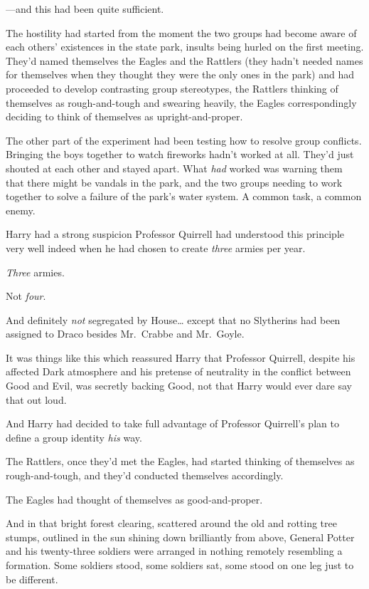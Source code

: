 ---and this had been quite sufficient.

The hostility had started from the moment the two groups had become aware of 
each others' existences in the state park, insults being hurled on the first 
meeting. They'd named themselves the Eagles and the Rattlers (they hadn't 
needed names for themselves when they thought they were the only ones in the 
park) and had proceeded to develop contrasting group stereotypes, the Rattlers 
thinking of themselves as rough-and-tough and swearing heavily, the Eagles 
correspondingly deciding to think of themselves as upright-and-proper.

The other part of the experiment had been testing how to resolve group 
conflicts. Bringing the boys together to watch fireworks hadn't worked at all. 
They'd just shouted at each other and stayed apart. What \emph{had} worked was 
warning them that there might be vandals in the park, and the two groups 
needing to work together to solve a failure of the park's water system. A 
common task, a common enemy.

Harry had a strong suspicion Professor Quirrell had understood this principle 
very well indeed when he had chosen to create \emph{three} armies per year.

\emph{Three} armies.

Not \emph{four}.

And definitely \emph{not} segregated by House{\ldots} except that no Slytherins 
had been assigned to Draco besides Mr.~Crabbe and Mr.~Goyle.

It was things like this which reassured Harry that Professor Quirrell, despite 
his affected Dark atmosphere and his pretense of neutrality in the conflict 
between Good and Evil, was secretly backing Good, not that Harry would ever 
dare say that out loud.

And Harry had decided to take full advantage of Professor Quirrell's plan to 
define a group identity \emph{his} way.

The Rattlers, once they'd met the Eagles, had started thinking of themselves as 
rough-and-tough, and they'd conducted themselves accordingly.

The Eagles had thought of themselves as good-and-proper.

And in that bright forest clearing, scattered around the old and rotting tree 
stumps, outlined in the sun shining down brilliantly from above, General Potter 
and his twenty-three soldiers were arranged in nothing remotely resembling a 
formation. Some soldiers stood, some soldiers sat, some stood on one leg just 
to be different.

